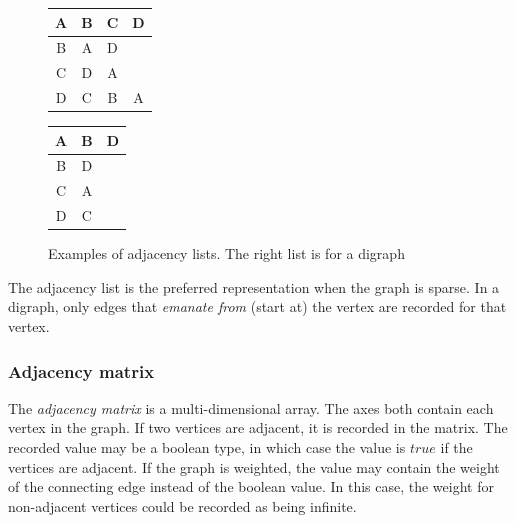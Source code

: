 \documentclass{article}
\begin{document}
\begin{figure}[H]
  \centering
  \begin{tabular}{|c|c c c|}
    \hline
    A  & B & C & D  \\ [0.5ex]
    \hline
    B  & A & D & \  \\
    \hline
    C  & D & A & \  \\
    \hline
    D  & C & B & A  \\
    \hline
  \end{tabular}
  \quad
  \begin{tabular}{|c|c c|}
    \hline
    A  & B & D  \\ [0.5ex]
    \hline
    B  & D & \  \\
    \hline
    C  & A & \  \\
    \hline
    D  & C & \  \\
    \hline
  \end{tabular}
  \caption{Examples of adjacency lists. The right list is for a digraph}
\end{figure}

The adjacency list is the preferred representation when the graph is sparse. In a digraph, only edges that {\em emanate from}
(start at) the vertex are recorded for that vertex.

\subsubsection{Adjacency matrix}
The {\em adjacency matrix} is a multi-dimensional array. The axes both contain each vertex in the graph. If two vertices are
adjacent, it is recorded in the matrix. The recorded value may be a boolean type, in which case the value is \(true\) if the
vertices are adjacent. If the graph is weighted, the value may contain the weight of the connecting edge instead of the boolean
value. In this case, the weight for non-adjacent vertices could be recorded as being infinite.
\end{document}
